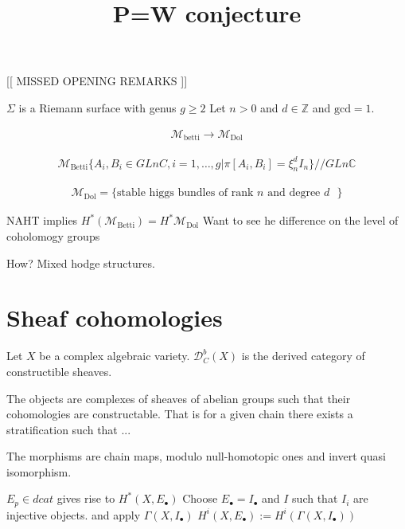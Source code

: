 
% 



\title{P=W conjecture}
\author{}
\date{}

 
\maketitle

[[ MISSED OPENING REMARKS ]] 

$\Sigma$ is a Riemann surface with genus $g \geq 2 $ 
Let $ n >0 $ and $ d \in \mathbb{Z} $ and $ \mathrm{gcd} =1 $. 

\begin{align}
    \mathcal{M}_{\mathrm{betti}} \rightarrow  \mathcal{M}_{\mathrm{Dol}}
\end{align}

\begin{align}
    \mathcal{M}_{\mathrm{Betti}} \{ A_i, B_i \in GLnC , i = 1, \dots, g | \pi[A_i, B_i ] = \xi ^d_n I_n \} // GLn\mathbb{C} 
\end{align}

\begin{align}
    \mathcal{M}_{\mathrm{Dol}} = \{ \mbox{stable higgs bundles of rank $n$ and degree $d$ } \} 
\end{align}

NAHT implies 
$ H^* ( \mathcal{M}_{\mathrm{Betti}}) = H^* \mathcal{M}_{\mathrm{Dol}}$ 
Want to see he difference on the level of coholomogy groups

How? Mixed hodge structures. 

\section{Sheaf cohomologies} %

\begin{definition}
    Let $X$ be a complex algebraic variety. 
    $\mathcal{D} _{C}  ^b (X) $ is the derived category of constructible sheaves. 

    The objects are complexes of sheaves of abelian groups 
    such that their cohomologies are constructable. 
    That is for a given chain there exists a stratification such that ...


    The morphisms are chain maps, modulo null-homotopic ones and invert quasi isomorphism. 
\end{definition}

$ E_p \in dcat $ gives rise to $ H ^* ( X, E_\bullet ) $ 
Choose $ E_\bullet = I _\bullet $ 
and $I$ such that $ I_i $ are injective objects. 
and apply $\Gamma ( X, I_\bullet) $ 
$ H ^i ( X, E_\bullet ) := H^i ( \Gamma ( X, I_\bullet) ) $ 

